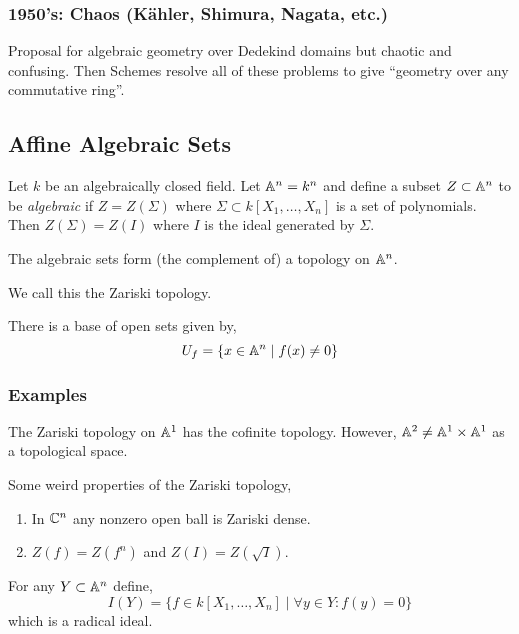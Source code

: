 \documentclass[12pt]{article}
\begin{document}
\subsubsection{1950's: Chaos (K\"{a}hler, Shimura, Nagata, etc.)}

Proposal for algebraic geometry over Dedekind domains but chaotic and confusing. Then Schemes resolve all of these problems to give ``geometry over any commutative ring''. 

\subsection{Affine Algebraic Sets}

Let $k$ be an algebraically closed field. Let $\mathbb{A}^n = k^n$ and define a subset $Z \subset \mathbb{A}^n$ to be \textit{algebraic} if $Z = Z(\Sigma)$ where $\Sigma \subset k[X_1, \dots, X_n]$ is a set of polynomials. Then $Z(\Sigma) = Z(I)$ where $I$ is the ideal generated by $\Sigma$.

\begin{thm}
The algebraic sets form (the complement of) a topology on $\mathbb{A}^n$.
\end{thm}

\begin{rmk}
We call this the Zariski topology.
\end{rmk}
\noindent
There is a base of open sets given by,
\[ U_f = \{ x \in \mathbb{A}^n \mid f(x) \neq 0 \} \]

\subsubsection{Examples}

The Zariski topology on $\mathbb{A}^1$ has the cofinite topology. However, $\mathbb{A}^2 \neq \mathbb{A}^1 \times \mathbb{A}^1$ as a topological space. 

\begin{rmk}
Some weird properties of the Zariski topology,
\begin{enumerate}
\item In $\mathbb{C}^n$ any nonzero open ball is Zariski dense.
\item $Z(f) = Z(f^n)$ and $Z(I) = Z(\sqrt{I})$.
\end{enumerate}
\end{rmk}

\begin{defn}
For any $Y \subset \mathbb{A}^n$ define,
\[ I(Y) = \{ f \in k[X_1, \dots, X_n] \mid \forall y \in Y : f(y) = 0 \} \]
which is a radical ideal.
\end{defn}
\end{document}
